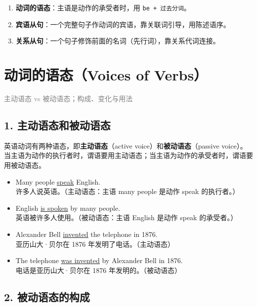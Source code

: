 \documentclass[11pt,a4paper]{ctexart}
\begin{document}
\begin{enumerate}[leftmargin=1.4em]
\item \textbf{动词的语态}：主语是动作的承受者时，用 \texttt{be + 过去分词}。
\item \textbf{宾语从句}：一个完整句子作动词的宾语，靠关联词引导，用陈述语序。
\item \textbf{关系从句}：一个句子修饰前面的名词（先行词），靠关系代词连接。
\end{enumerate}

\section{动词的语态（Voices of Verbs）}
\noindent\textcolor{gray}{主动语态 vs 被动语态；构成、变化与用法}\par\smallskip
\subsection*{1. 主动语态和被动语态}

英语动词有两种语态，即\textbf{主动语态}（active voice）和\textbf{被动语态}（passive voice）。当主语为动作的执行者时，谓语要用主动语态；当主语为动作的承受者时，谓语要用被动语态。

\begin{itemize}[leftmargin=1.4em]
\item Many people \underline{speak} English.\\ 许多人说英语。（主动语态：主语 many people 是动作 speak 的执行者。）
\item English \underline{is spoken} by many people.\\ 英语被许多人使用。（被动语态：主语 English 是动作 speak 的承受者。）
\end{itemize}

\begin{itemize}[leftmargin=1.4em]
\item Alexander Bell \underline{invented} the telephone in 1876.\\ 亚历山大·贝尔在 1876 年发明了电话。（主动语态）
\item The telephone \underline{was invented} by Alexander Bell in 1876.\\ 电话是亚历山大·贝尔在 1876 年发明的。（被动语态）
\end{itemize}

\subsection*{2. 被动语态的构成}
\end{document}
